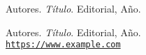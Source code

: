 \cleardoublepage
{}
{}
\begin{thebibliography}{9}
	Autores.
	\textit{Título}.
	Editorial, Año.

	Autores.
	\textit{Título}.
	Editorial, Año.
	\href{https://www.example.com}{
		\\\texttt{https://www.example.com}}
\end{thebibliography}

